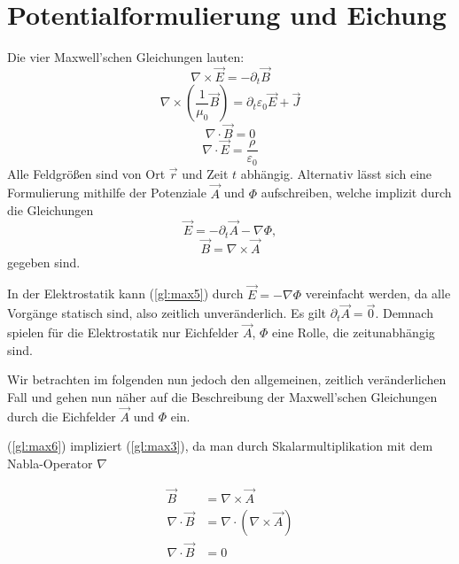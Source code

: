 \section{Potentialformulierung und Eichung}
Die vier Maxwell'schen Gleichungen lauten:
\begin{equation}
\label{gl:max1}
\nabla \times \vec{E} = -\partial_t\vec{B}
\end{equation}
\begin{equation}
\label{gl:max2}
\nabla \times \left(\frac{1}{\mu_0}\vec{B}\right) = \partial_t\varepsilon_0\vec{E} + \vec{J}
\end{equation}
\begin{equation}
\label{gl:max3}
\nabla \cdot \vec{B} = 0
\end{equation}
\begin{equation}
\label{gl:max4}
\nabla \cdot \vec{E} = \frac{\rho}{\varepsilon_0}
\end{equation}
Alle Feldgrößen sind von Ort $\vec{r}$ und Zeit $t$ abhängig. Alternativ lässt sich eine Formulierung mithilfe der Potenziale $\vec{A}$ und $\Phi$ aufschreiben, welche implizit durch die Gleichungen
\begin{equation}
\label{gl:max5}
\vec{E} = -\partial_t\vec{A} - \nabla\Phi,
\end{equation}
\begin{equation}
\label{gl:max6}
\vec{B} = \nabla\times\vec{A}
\end{equation}
gegeben sind.

In der Elektrostatik kann (\ref{gl:max5}) durch $\vec{E} = - \nabla\Phi$ vereinfacht werden, da alle Vorgänge statisch sind, also zeitlich unveränderlich. Es gilt $\partial_t\vec{A} = \vec{0}$. Demnach spielen für die Elektrostatik nur Eichfelder $\vec{A}$, $\Phi$ eine Rolle, die zeitunabhängig sind.

Wir betrachten im folgenden nun jedoch den allgemeinen, zeitlich veränderlichen Fall und gehen nun näher auf die Beschreibung der Maxwell'schen Gleichungen durch die Eichfelder $\vec{A}$ und $\Phi$ ein.

(\ref{gl:max6}) impliziert (\ref{gl:max3}), da man durch Skalarmultiplikation mit dem Nabla-Operator $\nabla$

\begin{align*}
\vec{B} &= \nabla\times\vec{A} \\
\nabla \cdot \vec{B} &= \nabla \cdot (\nabla\times\vec{A}) \\
\nabla \cdot \vec{B} &= 0
\end{align*}

